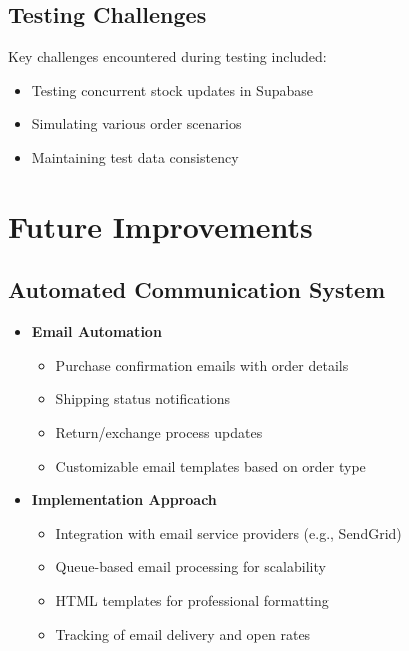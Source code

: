 \documentclass[12pt,a4paper]{article}
\begin{document}
\subsection{Testing Challenges}
Key challenges encountered during testing included:
\begin{itemize}
    \item Testing concurrent stock updates in Supabase
    \item Simulating various order scenarios
    \item Maintaining test data consistency
\end{itemize}

\section{Future Improvements}

\subsection{Automated Communication System}
\begin{itemize}
    \item \textbf{Email Automation}
    \begin{itemize}
        \item Purchase confirmation emails with order details
        \item Shipping status notifications
        \item Return/exchange process updates
        \item Customizable email templates based on order type
    \end{itemize}
    
    \item \textbf{Implementation Approach}
    \begin{itemize}
        \item Integration with email service providers (e.g., SendGrid)
        \item Queue-based email processing for scalability
        \item HTML templates for professional formatting
        \item Tracking of email delivery and open rates
    \end{itemize}
\end{itemize}
\end{document}
